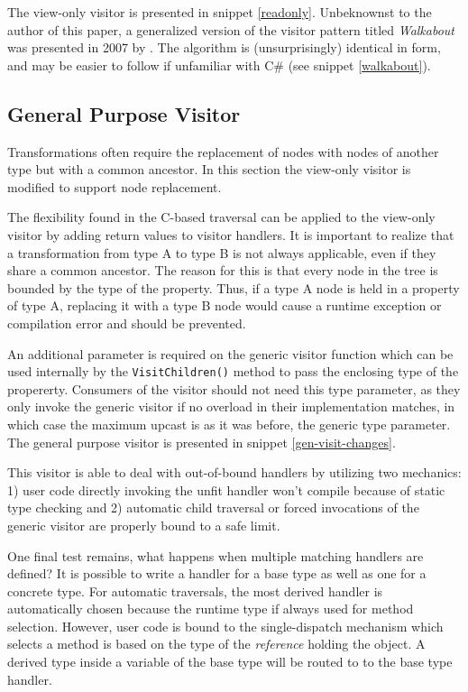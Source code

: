 \documentclass[twoside,openright]{uva-bachelor-thesis}
\newcommand{\code}[1]{\texttt{\footnotesize#1}}
\begin{document}
			The view-only visitor is presented in snippet \ref{readonly}. Unbeknownst to the author of this paper, a generalized version of the visitor pattern titled \emph{Walkabout} was presented in 2007 by \citeauthor{palsberg1998essence}. The algorithm is (unsurprisingly) identical in form, and may be easier to follow if unfamiliar with C\# (see snippet \ref{walkabout}).
		
		\subsection{General Purpose Visitor}
			Transformations often require the replacement of nodes with nodes of another type but with a common ancestor. In this section the view-only visitor is modified to support node replacement.
			
			The flexibility found in the C-based traversal can be applied to the view-only visitor by adding return values to visitor handlers. It is important to realize that a transformation from type A to type B is not always applicable, even if they share a common ancestor. The reason for this is that every node in the tree is bounded by the type of the property. Thus, if a type A node is held in a property of type A, replacing it with a type B node would cause a runtime exception or compilation error and should be prevented.
			
			An additional parameter is required on the generic visitor function which can be used internally by the  \code{VisitChildren()} method to pass the enclosing type of the propererty. Consumers of the visitor should not need this type parameter, as they only invoke the generic visitor if no overload in their implementation matches, in which case the maximum upcast is as it was before, the generic type parameter. The general purpose visitor is presented in snippet \ref{gen-visit-changes}.
			
			This visitor is able to deal with out-of-bound handlers by utilizing two mechanics: 1) user code directly invoking the unfit handler won't compile because of static type checking and 2) automatic child traversal or forced invocations of the generic visitor are properly bound to a safe limit.
			
			One final test remains, what happens when multiple matching handlers are defined? It is possible to write a handler for a base type as well as one for a concrete type. For automatic traversals, the most derived handler is automatically chosen because the runtime type if always used for method selection. However, user code is bound to the single-dispatch mechanism which selects a method is based on the type of the \emph{reference} holding the object. A derived type inside a variable of the base type will be routed to to the base type handler.
			
\end{document}
